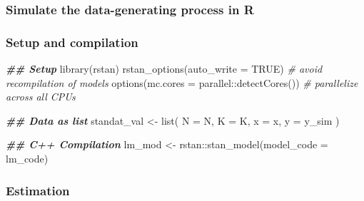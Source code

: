 \documentclass[
  11pt,
]{article}
\newenvironment{Shaded}{\begin{snugshade}}{\end{snugshade}}
\newcommand{\AttributeTok}[1]{\textcolor[rgb]{0.77,0.63,0.00}{#1}}
\newcommand{\CommentTok}[1]{\textcolor[rgb]{0.56,0.35,0.01}{\textit{#1}}}
\newcommand{\ConstantTok}[1]{\textcolor[rgb]{0.00,0.00,0.00}{#1}}
\newcommand{\DocumentationTok}[1]{\textcolor[rgb]{0.56,0.35,0.01}{\textbf{\textit{#1}}}}
\newcommand{\FunctionTok}[1]{\textcolor[rgb]{0.00,0.00,0.00}{#1}}
\newcommand{\NormalTok}[1]{#1}
\newcommand{\OtherTok}[1]{\textcolor[rgb]{0.56,0.35,0.01}{#1}}
\newcommand{\SpecialCharTok}[1]{\textcolor[rgb]{0.00,0.00,0.00}{#1}}
\begin{document}
\hypertarget{simulate-the-data-generating-process-in-r}{%
\subsubsection{Simulate the data-generating process in R}\label{simulate-the-data-generating-process-in-r}}

\hypertarget{setup-and-compilation}{%
\subsubsection{Setup and compilation}\label{setup-and-compilation}}

\begin{Shaded}
\begin{Highlighting}[]
\DocumentationTok{\#\# Setup}
\FunctionTok{library}\NormalTok{(rstan)}
\FunctionTok{rstan\_options}\NormalTok{(}\AttributeTok{auto\_write =} \ConstantTok{TRUE}\NormalTok{)             }\CommentTok{\# avoid recompilation of models}
\FunctionTok{options}\NormalTok{(}\AttributeTok{mc.cores =}\NormalTok{ parallel}\SpecialCharTok{::}\FunctionTok{detectCores}\NormalTok{())  }\CommentTok{\# parallelize across all CPUs}

\DocumentationTok{\#\# Data as list}
\NormalTok{standat\_val }\OtherTok{\textless{}{-}} \FunctionTok{list}\NormalTok{(}
  \AttributeTok{N =}\NormalTok{ N,}
  \AttributeTok{K =}\NormalTok{ K,}
  \AttributeTok{x =}\NormalTok{ x,}
  \AttributeTok{y =}\NormalTok{ y\_sim}
\NormalTok{)}

\DocumentationTok{\#\# C++ Compilation}
\NormalTok{lm\_mod }\OtherTok{\textless{}{-}}\NormalTok{ rstan}\SpecialCharTok{::}\FunctionTok{stan\_model}\NormalTok{(}\AttributeTok{model\_code =}\NormalTok{ lm\_code)}
\end{Highlighting}
\end{Shaded}

\hypertarget{estimation}{%
\subsubsection{Estimation}\label{estimation}}
\end{document}
